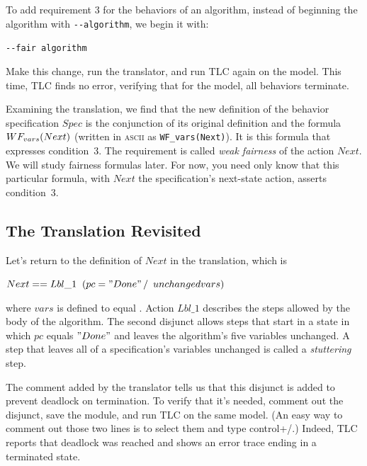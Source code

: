 \documentclass[fleqn,leqno]{article}
\begin{document}
To add requirement 3 for the behaviors of an algorithm, 
instead of beginning the algorithm with \texttt{-{}-algorithm},
we begin it with:
\begin{display}
\tt -\mbox{}-fair algorithm
\end{display}
Make this change, run the translator, and run TLC again on the model.
This time, TLC finds no error, verifying that for the model, all
behaviors terminate.

Examining the translation, we find that the new definition of 
the behavior specification $Spec$
is the conjunction of its original definition and the formula
$\WF_{vars}(Next)$ (written in \textsc{ascii} as \verb|WF_vars(Next)|).
It is this formula that expresses condition~3.  The requirement is
called 
\emph{weak fairness} of the action $Next$.  We will study
fairness formulas later.  For now, you need only know that this
particular formula, with $Next$ the specification's next-state action,
asserts condition~3.%


\subsection{The Translation Revisited}

Let's return to the definition of $Next$ in the translation, which is
\begin{display}
$Next == Lbl\_1 \; \/ \; (pc = "Done" \, /\ \, \UNCHANGED vars)$
\end{display}
where $vars$ is defined to equal 
 .  
Action $Lbl\_1$ describes the steps allowed by the body of the
algorithm.  The second disjunct allows steps that start in a state in
which $pc$ equals $"Done"$ and leaves the algorithm's five variables
unchanged.  A step that leaves all of a specification's variables
unchanged is called a
\emph{stuttering} step.  

The comment added by the translator tells us that this disjunct is
added to prevent deadlock on termination.  To verify that it's needed,
comment out the disjunct, save the module, and run TLC on the same
model.  (An easy way to comment out those two lines is to select
them and type \textsf{control+/}.)  Indeed, TLC reports that deadlock
was reached and shows an error trace ending in a terminated state.
\end{document}
